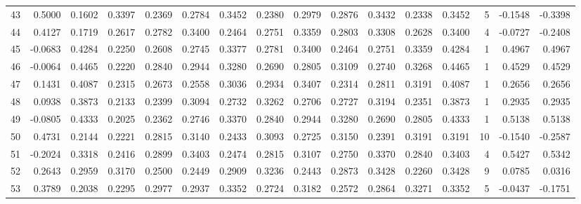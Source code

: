 \begin{tabular}{lrrrrrrrrrrrrrrr}
43  &      0.5000 &  0.1602 &  0.3397 &  0.2369 &  0.2784 &  0.3452 &  0.2380 &  0.2979 &  0.2876 &  0.3432 &   0.2338 &     0.3452 &      5 &                   -0.1548 &                    -0.3398 \\
44  &      0.4127 &  0.1719 &  0.2617 &  0.2782 &  0.3400 &  0.2464 &  0.2751 &  0.3359 &  0.2803 &  0.3308 &   0.2628 &     0.3400 &      4 &                   -0.0727 &                    -0.2408 \\
45  &     -0.0683 &  0.4284 &  0.2250 &  0.2608 &  0.2745 &  0.3377 &  0.2781 &  0.3400 &  0.2464 &  0.2751 &   0.3359 &     0.4284 &      1 &                    0.4967 &                     0.4967 \\
46  &     -0.0064 &  0.4465 &  0.2220 &  0.2840 &  0.2944 &  0.3280 &  0.2690 &  0.2805 &  0.3109 &  0.2740 &   0.3268 &     0.4465 &      1 &                    0.4529 &                     0.4529 \\
47  &      0.1431 &  0.4087 &  0.2315 &  0.2673 &  0.2558 &  0.3036 &  0.2934 &  0.3407 &  0.2314 &  0.2811 &   0.3191 &     0.4087 &      1 &                    0.2656 &                     0.2656 \\
48  &      0.0938 &  0.3873 &  0.2133 &  0.2399 &  0.3094 &  0.2732 &  0.3262 &  0.2706 &  0.2727 &  0.3194 &   0.2351 &     0.3873 &      1 &                    0.2935 &                     0.2935 \\
49  &     -0.0805 &  0.4333 &  0.2025 &  0.2362 &  0.2746 &  0.3370 &  0.2840 &  0.2944 &  0.3280 &  0.2690 &   0.2805 &     0.4333 &      1 &                    0.5138 &                     0.5138 \\
50  &      0.4731 &  0.2144 &  0.2221 &  0.2815 &  0.3140 &  0.2433 &  0.3093 &  0.2725 &  0.3150 &  0.2391 &   0.3191 &     0.3191 &     10 &                   -0.1540 &                    -0.2587 \\
51  &     -0.2024 &  0.3318 &  0.2416 &  0.2899 &  0.3403 &  0.2474 &  0.2815 &  0.3107 &  0.2750 &  0.3370 &   0.2840 &     0.3403 &      4 &                    0.5427 &                     0.5342 \\
52  &      0.2643 &  0.2959 &  0.3170 &  0.2500 &  0.2449 &  0.2909 &  0.3236 &  0.2443 &  0.2873 &  0.3428 &   0.2260 &     0.3428 &      9 &                    0.0785 &                     0.0316 \\
53  &      0.3789 &  0.2038 &  0.2295 &  0.2977 &  0.2937 &  0.3352 &  0.2724 &  0.3182 &  0.2572 &  0.2864 &   0.3271 &     0.3352 &      5 &                   -0.0437 &                    -0.1751 \\

\end{tabular}
